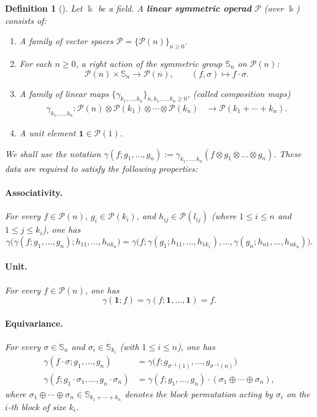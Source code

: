 \documentclass[10pt]{article}
\newtheorem {definition}[lemma] {Definition}
\theoremstyle{definition}
\newcommand{\ten}{\otimes}
\begin{document}
\begin{definition}[{\cite[Definition 1.4]{MSS}}]
Let $\Bbbk$ be a field. A \textbf{linear symmetric operad} $\mathcal P$
(over $\Bbbk$) consists of:

\begin{enumerate}
\item A family of vector spaces $\mathcal{P}=\{ \mathcal{P}(n)\}_{n \geq 0}$.
\item For each $n \geq 0$, a right action of the symmetric group $\mathbb{S}_n$ on
$ \mathcal{P}(n)$:
\[
 \mathcal{P}(n) \times \mathbb{S}_n \to \mathcal{P}(n),
\qquad (f,\sigma)\mapsto f\cdot\sigma.
\]

\item A family of linear maps $\{ \gamma_{k_1,\ldots,k_n}\}_{n,k_1,\ldots,k_n \geq 0}$, (called composition maps)
\begin{align*}
\gamma_{k_1,\ldots,k_n}: \mathcal{P}(n) \ten \mathcal{P}(k_1) \ten \cdots \ten \mathcal{P}(k_n) &\to \mathcal{P}(k_1 + \cdots + k_n).
\end{align*}

\item A unit element $\mathbf 1\in \mathcal{P}(1)$.
\end{enumerate}

We shall use the notation $\gamma(f;g_1,\ldots,g_n):= \gamma_{k_1,\ldots,k_n}(f \ten g_1 \ten \ldots \ten g_n)$. These data are required to satisfy the following properties:

\paragraph{Associativity.}
For every $f\in\mathcal P(n)$, $g_i\in\mathcal P(k_i)$, and $h_{ij}\in\mathcal P(l_{ij})$ (where $1 \leq i \leq n$ and $1 \leq j \leq k_i$), one has
\[
\gamma\!\bigl(
\gamma(f;g_1,\dots,g_n);
h_{11},\dots,h_{n k_n}
\bigr)
=
\gamma\!\bigl(
f;
\gamma(g_1;h_{11},\dots,h_{1k_1}),
\dots,
\gamma(g_n;h_{n1},\dots,h_{nk_n})
\bigr).
\]

\paragraph{Unit.}
For every $f\in\mathcal P(n)$, one has 
\[
\gamma(\mathbf 1;f)=\gamma(f;\mathbf 1,\dots,\mathbf 1)=f.
\]


\paragraph{Equivariance.}
For every $\sigma \in \mathbb{S}_n$ and
$\sigma_i \in \mathbb{S}_{k_i}$ (with $1 \le i \le n$), one has
\begin{align*}
\gamma(f \cdot \sigma; g_1,\ldots,g_n)
&=
\gamma\bigl(
f;
g_{\sigma^{-1}(1)},
\ldots,
g_{\sigma^{-1}(n)}
\bigr)\\
\gamma(f;
g_1 \cdot \sigma_1,
\ldots,
g_n \cdot \sigma_n
)
&=
\gamma(f;g_1,\ldots,g_n)
\cdot
(\sigma_1 \oplus \cdots \oplus \sigma_n),
\end{align*}
where $\sigma_1 \oplus \cdots \oplus \sigma_n
\in
\mathbb{S}_{k_1+\cdots+k_n}$
denotes the block permutation acting by $\sigma_i$ on the
$i$-th block of size $k_i$.
\end{definition}
\end{document}
